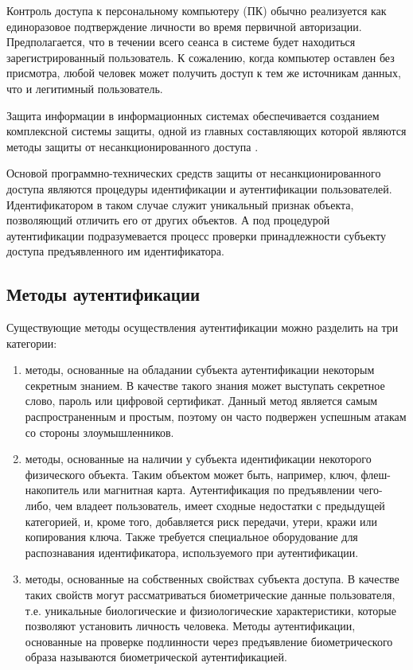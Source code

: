 \documentclass[12pt]{article}
\begin{document}
    \par Контроль доступа к персональному компьютеру (ПК) обычно реализуется как единоразовое подтверждение личности во время первичной авторизации. Предполагается, что в течении всего сеанса в системе будет находиться зарегистрированный пользователь. К сожалению, когда компьютер оставлен без присмотра, любой человек может получить доступ к тем же источникам данных, что и легитимный пользователь.

    \par Защита информации в информационных системах обеспечивается созданием комплексной системы защиты, одной из главных составляющих которой являются методы защиты от несанкционированного доступа \cite{BiometricRecognition, BiometricSystem}.

    \par Основой программно-технических средств защиты от несанкционированного доступа являются процедуры идентификации и аутентификации пользователей. Идентификатором в таком случае служит уникальный признак объекта, позволяющий отличить его от других объектов. А под процедурой аутентификации подразумевается процесс проверки принадлежности субъекту доступа предъявленного им идентификатора.


    \subsection{Методы аутентификации}
    \label{sec:Intro:ApplicationArea:AuthenticationMethods}

    \par Существующие методы осуществления аутентификации можно разделить на три категории:

    \begin{enumerate}
        \item методы, основанные на обладании субъекта аутентификации некоторым секретным знанием. В качестве такого знания может выступать секретное слово, пароль или цифровой сертификат. Данный метод является самым распространенным и простым, поэтому он часто подвержен успешным атакам со стороны злоумышленников.

        \item методы, основанные на наличии у субъекта идентификации некоторого физического объекта. Таким объектом может быть, например, ключ, флеш-накопитель или магнитная карта. Аутентификация по предъявлении чего-либо, чем владеет пользователь, имеет сходные недостатки с предыдущей категорией, и, кроме того, добавляется риск передачи, утери, кражи или копирования ключа. Также требуется специальное оборудование для распознавания идентификатора, используемого при аутентификации.

        \item методы, основанные на собственных свойствах субъекта доступа. В качестве таких свойств могут рассматриваться биометрические данные пользователя, т.е. уникальные биологические и физиологические характеристики, которые позволяют установить личность человека. Методы аутентификации, основанные на проверке подлинности через предъявление биометрического образа называются биометрической аутентификацией.
    \end{enumerate}
\end{document}
